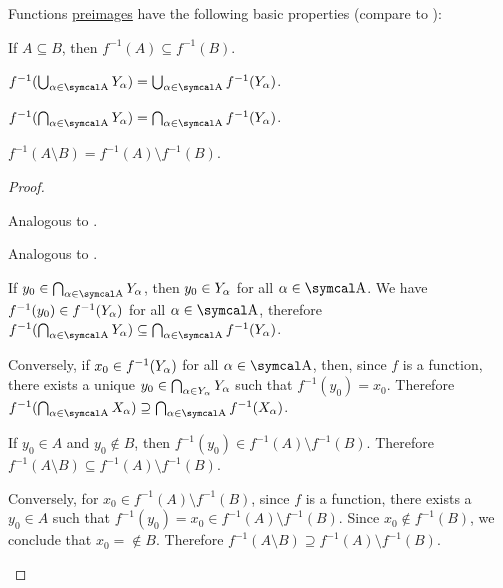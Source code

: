 \begin{proposition}\label{thm:function_preimage_properties}
  Functions \hyperref[def:function/preimage]{preimages} have the following basic properties (compare to ):
  \begin{propenum}
     If \( A \subseteq B \), then \( f^{-1}(A) \subseteq f^{-1}(B) \).

     \( f^{-1}(\bigcup_{\al \in \CA} Y_\al) = \bigcup_{\al \in \CA} f^{-1}(Y_\al) \).

     \( f^{-1}(\bigcap_{\al \in \CA} Y_\al) = \bigcap_{\al \in \CA} f^{-1}(Y_\al) \).

     \( f^{-1}(A \setminus B) = f^{-1}(A) \setminus f^{-1}(B) \).
  \end{propenum}
\end{proposition}
\begin{proof}\mbox{}
  \begin{propenum}
     Analogous to .

     Analogous to .

     If \( y_0 \in \bigcap_{\al \in \CA} Y_{\al} \), then \( y_0 \in Y_\alpha \) for all \( \al \in \CA \). We have \( f^{-1}(y_0) \in f^{-1}(Y_\alpha) \) for all \( \al \in \CA \), therefore \( f^{-1}(\bigcap_{\al \in \CA} Y_\al) \subseteq \bigcap_{\al \in \CA} f^{-1}(Y_\al) \).

    Conversely, if \( x_0 \in f^{-1}(Y_\alpha) \) for all \( \al \in \CA \), then, since \( f \) is a function, there exists a unique \( y_0 \in \bigcap_{\alpha \in Y_\alpha}Y_\alpha \) such that \( f^{-1}(y_0) = x_0 \). Therefore \( f^{-1}(\bigcap_{\al \in \CA} X_\al) \supseteq \bigcap_{\al \in \CA} f^{-1}(X_\al) \).

     If \( y_0 \in A \) and \( y_0 \not\in B \), then \( f^{-1}(y_0) \in f^{-1}(A) \setminus f^{-1}(B) \). Therefore \( f^{-1}(A \setminus B) \subseteq f^{-1}(A) \setminus f^{-1}(B) \).

    Conversely, for \( x_0 \in f^{-1}(A) \setminus f^{-1}(B) \), since \( f \) is a function, there exists a \( y_0 \in A \) such that \( f^{-1}(y_0) = x_0 \in f^{-1}(A) \setminus f^{-1}(B) \). Since \( x_0 \not\in f^{-1}(B) \), we conclude that \( x_0 = \not\in B \). Therefore \( f^{-1}(A \setminus B) \supseteq f^{-1}(A) \setminus f^{-1}(B) \).
  \end{propenum}
\end{proof}

